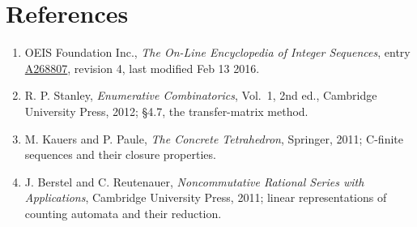 \documentclass[11pt]{article}
\theoremstyle{definition}
\begin{document}
\section{References}

\begin{enumerate}

\item OEIS Foundation Inc., \emph{The On-Line Encyclopedia of Integer Sequences}, entry \href{https://oeis.org/A268807}{A268807}, revision 4, last modified Feb 13 2016.

\item R. P. Stanley, \emph{Enumerative Combinatorics}, Vol.~1, 2nd ed., Cambridge University Press, 2012; \S4.7, the transfer-matrix method.

\item M. Kauers and P. Paule, \emph{The Concrete Tetrahedron}, Springer, 2011; C-finite sequences and their closure properties.

\item J. Berstel and C. Reutenauer, \emph{Noncommutative Rational Series with Applications}, Cambridge University Press, 2011; linear representations of counting automata and their reduction.

\end{enumerate}
\end{document}
